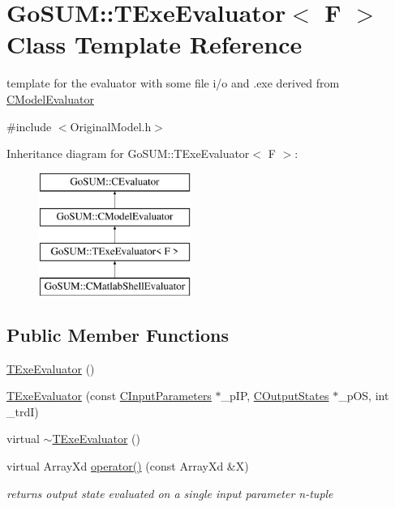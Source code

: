 \hypertarget{class_go_s_u_m_1_1_t_exe_evaluator}{\section{Go\-S\-U\-M\-:\-:T\-Exe\-Evaluator$<$ F $>$ Class Template Reference}
\label{class_go_s_u_m_1_1_t_exe_evaluator}
}


template for the evaluator with some file i/o and .exe derived from \hyperlink{class_go_s_u_m_1_1_c_model_evaluator}{C\-Model\-Evaluator}  




{\ttfamily \#include $<$Original\-Model.\-h$>$}

Inheritance diagram for Go\-S\-U\-M\-:\-:T\-Exe\-Evaluator$<$ F $>$\-:\begin{figure}[H]
\begin{center}
\leavevmode
\includegraphics[height=4.000000cm]{class_go_s_u_m_1_1_t_exe_evaluator}
\end{center}
\end{figure}
\subsection*{Public Member Functions}
\begin{DoxyCompactItemize}
\item 
\hyperlink{class_go_s_u_m_1_1_t_exe_evaluator_a4f4da2a5218c752a28cd626fb442fb76}{T\-Exe\-Evaluator} ()
\item 
\hyperlink{class_go_s_u_m_1_1_t_exe_evaluator_a2785431cde7f4c24b17ae61c8df0be8a}{T\-Exe\-Evaluator} (const \hyperlink{class_go_s_u_m_1_1_c_input_parameters}{C\-Input\-Parameters} $\ast$\-\_\-p\-I\-P, \hyperlink{class_go_s_u_m_1_1_c_output_states}{C\-Output\-States} $\ast$\-\_\-p\-O\-S, int \-\_\-trd\-I)
\item 
virtual \hyperlink{class_go_s_u_m_1_1_t_exe_evaluator_a337a006e72c79c487dfedf233f116626}{$\sim$\-T\-Exe\-Evaluator} ()
\item 
virtual Array\-Xd \hyperlink{class_go_s_u_m_1_1_t_exe_evaluator_ac70575204e298f146646c923b31c2edd}{operator()} (const Array\-Xd \&X)
\begin{DoxyCompactList}\small\item\em returns output state evaluated on a single input parameter n-\/tuple \end{DoxyCompactList}\end{DoxyCompactItemize}
